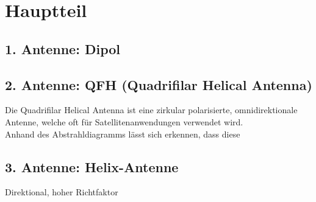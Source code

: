 \chapter{Hauptteil}

\section{1. Antenne: Dipol}

\section{2. Antenne: QFH (Quadrifilar Helical Antenna)}
Die Quadrifilar Helical Antenna ist eine zirkular polarisierte, omnidirektionale Antenne, welche oft für Satellitenanwendungen verwendet wird.\\

Anhand des Abstrahldiagramms lässt sich erkennen, dass diese 

\section{3. Antenne: Helix-Antenne}
Direktional, hoher Richtfaktor